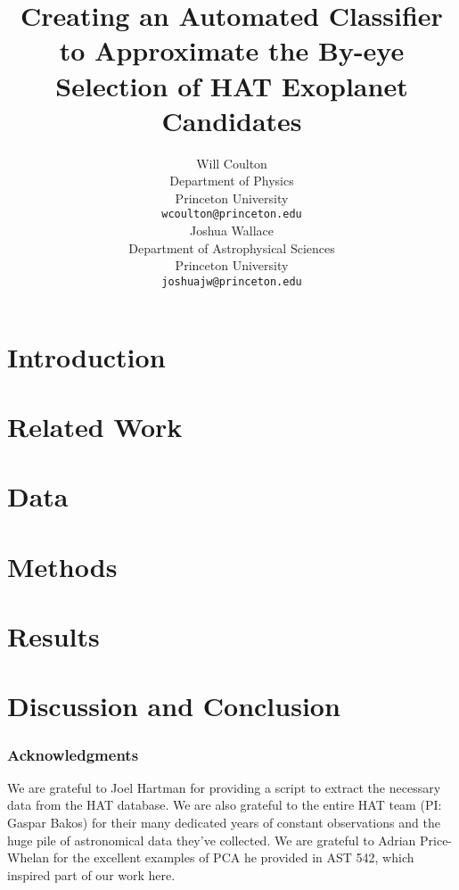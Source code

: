 \documentclass{article} %
\title{Creating an Automated Classifier to Approximate the By-eye
  Selection of HAT Exoplanet Candidates}
\author{
Will Coulton \\
Department of Physics \\
Princeton University\\
\texttt{wcoulton@princeton.edu} \\
\And
Joshua Wallace\\
Department of Astrophysical Sciences\\
Princeton University\\
\texttt{joshuajw@princeton.edu} \\
}
\begin{document}
\maketitle

\begin{abstract}

\end{abstract}

\section{Introduction}



\section{Related Work}


\section{Data}


\section{Methods}


\section{Results}



\section{Discussion and Conclusion}


\subsubsection*{Acknowledgments}
We are grateful to Joel Hartman for providing a script to extract the
necessary data from the HAT database.  We are also grateful to the
entire HAT team (PI: Gaspar Bakos) for their many dedicated years of
constant observations and the huge pile of astronomical data they've
collected.  We are grateful to Adrian Price-Whelan for the excellent
examples of PCA he provided in AST 542, which inspired part of our
work here.




\end{document}
